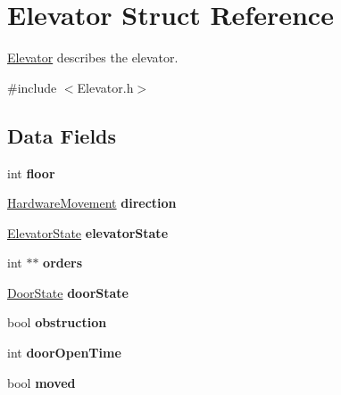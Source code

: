 \hypertarget{structElevator}{}\section{Elevator Struct Reference}
\label{structElevator}


{\ttfamily \hyperlink{structElevator}{Elevator}} describes the elevator.  




{\ttfamily \#include $<$Elevator.\+h$>$}

\subsection*{Data Fields}
\begin{DoxyCompactItemize}
\item 
\mbox{\label{structElevator_a7cb6a37b507eed9b1b34c5e0899c9936}} 
int {\bfseries floor}
\item 
\mbox{\label{structElevator_a5bc377c8e13b288861cc2e67866e9a5c}} 
\hyperlink{hardware_8h_a2167c399a24df296afc432bcb88228af}{Hardware\+Movement} {\bfseries direction}
\item 
\mbox{\label{structElevator_a525f5232440aff60dbb8aa9a3cac7969}} 
\hyperlink{Elevator_8h_ada8a6679b36fc4f29442334494afb588}{Elevator\+State} {\bfseries elevator\+State}
\item 
\mbox{\label{structElevator_a9b695c48b1b6168aaa3ef7ecacf52d13}} 
int $\ast$$\ast$ {\bfseries orders}
\item 
\mbox{\label{structElevator_a2af7ca94c67b2438c104ee5466ab6c30}} 
\hyperlink{Elevator_8h_a117f8df7c03b73093e6da94ae41b4252}{Door\+State} {\bfseries door\+State}
\item 
\mbox{\label{structElevator_a1f785b3bad1caf37c9c6eea79d745b9a}} 
bool {\bfseries obstruction}
\item 
\mbox{\label{structElevator_a76748d8f7bffe0e570816c342ebec24b}} 
int {\bfseries door\+Open\+Time}
\item 
\mbox{\label{structElevator_aab80471b4b4b896bbfb6cb1e28e643d6}} 
bool {\bfseries moved}
\end{DoxyCompactItemize}


